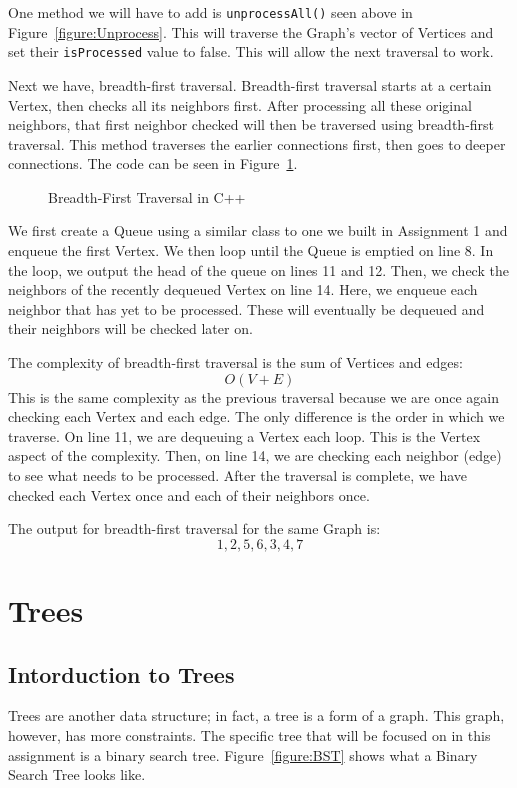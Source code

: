 \documentclass[letterpaper, 10pt,DIV=13]{scrartcl}
\numberwithin{equation}{section} %
\numberwithin{figure}{section} %
\numberwithin{table}{section} %
\begin{document}
One method we will have to add is \texttt{unprocessAll()} seen above in Figure~\ref{figure:Unprocess}. This will traverse the Graph's vector of Vertices and set their \texttt{isProcessed} value to false. This will allow the next traversal to work.

\pagebreak


Next we have, breadth-first traversal. Breadth-first traversal starts at a certain Vertex, then checks all its neighbors first. After processing all these original neighbors, that first neighbor checked will then be traversed using breadth-first traversal. This method traverses the earlier connections first, then goes to deeper connections. The code can be seen in Figure~\ref{figure:BFTCode}. 

\begin{figure}[h] 
    \centering 
    
    \caption{Breadth-First Traversal in C++}
    \label{figure:BFTCode}
\end{figure}


We first create a Queue using a similar class to one we built in Assignment 1 and enqueue the first Vertex. We then loop until the Queue is emptied on line 8. In the loop, we output the head of the queue on lines 11 and 12. Then, we check the neighbors of the recently dequeued Vertex on line 14. Here, we enqueue each neighbor that has yet to be processed. These will eventually be dequeued and their neighbors will be checked later on.


The complexity of breadth-first traversal is the sum of Vertices and edges:
\[O(V + E)\] 
This is the same complexity as the previous traversal because we are once again checking each Vertex and each edge. The only difference is the order in which we traverse. On line 11, we are dequeuing a Vertex each loop. This is the Vertex aspect of the complexity. Then, on line 14, we are checking each neighbor (edge) to see what needs to be processed. After the traversal is complete, we have checked each Vertex once and each of their neighbors once.

The output for breadth-first traversal for the same Graph is:
\[1, 2, 5, 6, 3, 4, 7\] 

\pagebreak


\section{Trees}
\subsection{Intorduction to Trees}
Trees are another data structure; in fact, a tree is a form of a graph. This graph, however, has more constraints. The specific tree that will be focused on in this assignment is a binary search tree. Figure~\ref{figure:BST} shows what a Binary Search Tree looks like.
\end{document}
